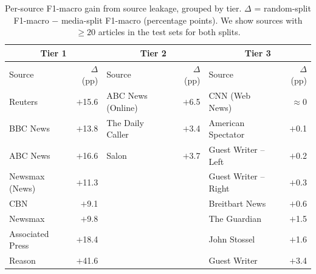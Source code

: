 \begin{table}[h]                                                                                               
  \centering
  \small                                                                                                            
  \begin{tabular}{lr|lr|lr}                                                                                         
  \toprule                                                                                                          
  \multicolumn{2}{c|}{\textbf{Tier 1}} &                                                                          
  \multicolumn{2}{c|}{\textbf{Tier 2}} &                                                                            
  \multicolumn{2}{c}{\textbf{Tier 3}} \\                                                  
  \midrule                                                                                                          
  Source & $\Delta$ (pp) & Source & $\Delta$ (pp) & Source & $\Delta$ (pp) \\                                       
  \midrule                                                                                                          
  Reuters              & $+$15.6 & ABC News (Online) & $+$6.5 & CNN (Web News)        & $\approx$0 \\
  BBC News             & $+$13.8 & The Daily Caller  & $+$3.4 & American Spectator    & $+$0.1 \\
  ABC News             & $+$16.6 & Salon             & $+$3.7 & Guest Writer -- Left  & $+$0.2 \\
  Newsmax (News)       & $+$11.3 &                   &        & Guest Writer -- Right & $+$0.3 \\
  CBN                  & $+$9.1  &                   &        & Breitbart News        & $+$0.6 \\
  Newsmax              & $+$9.8  &                   &        & The Guardian          & $+$1.5 \\
  Associated Press     & $+$18.4 &                   &        & John Stossel          & $+$1.6 \\
  Reason               & $+$41.6 &                   &        & Guest Writer          & $+$3.4 \\
  \bottomrule
  \end{tabular}
    \caption{Per-source F1-macro gain from source leakage, grouped by tier. $\Delta$ = random-split F1-macro $-$ media-split F1-macro (percentage points). We show sources with $\geq 20$ articles in the test sets for both splits.}                                                         
  \label{tab:source_leakage_tiers}                                             
  \end{table} 

